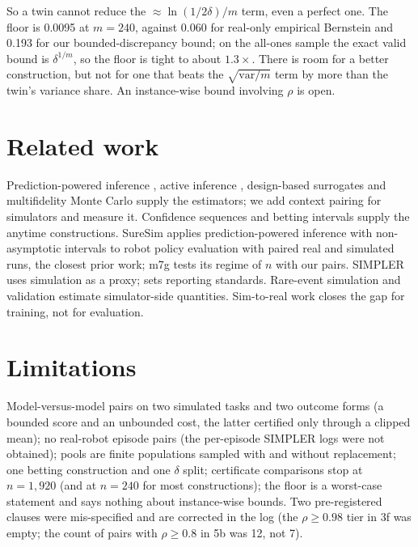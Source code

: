\documentclass[11pt]{article}
\begin{document}
So a twin cannot reduce the $\approx\ln(1/2\delta)/m$ term, even a perfect one. The floor is 0.0095 at $m=240$, against 0.060 for real-only empirical Bernstein and 0.193 for our bounded-discrepancy bound; on the all-ones sample the exact valid bound is $\delta^{1/m}$, so the floor is tight to about $1.3\times$. There is room for a better construction, but not for one that beats the $\sqrt{\mathrm{var}/m}$ term by more than the twin's variance share. An instance-wise bound involving $\rho$ is open.

\section{Related work}
Prediction-powered inference \cite{angelopoulos2023ppi,angelopoulos2023ppipp}, active inference \cite{zrnic2024active}, design-based surrogates \cite{egami2023surrogates} and multifidelity Monte Carlo \cite{peherstorfer2018survey} supply the estimators; we add context pairing for simulators and measure it. Confidence sequences and betting intervals \cite{howard2021confseq,waudbysmith2020betting} supply the anytime constructions. SureSim \cite{badithela2025suresim} applies prediction-powered inference with non-asymptotic intervals to robot policy evaluation with paired real and simulated runs, the closest prior work; m7g tests its regime of $n$ with our pairs. SIMPLER \cite{li2024simpler} uses simulation as a proxy; \cite{kressgazit2024empirical} sets reporting standards. Rare-event simulation and validation \cite{okelly2018rare,corso2021survey} estimate simulator-side quantities. Sim-to-real work \cite{tobin2017dr,zhao2020survey} closes the gap for training, not for evaluation.

\section{Limitations}
Model-versus-model pairs on two simulated tasks and two outcome forms (a bounded score and an unbounded cost, the latter certified only through a clipped mean); no real-robot episode pairs (the per-episode SIMPLER logs were not obtained); pools are finite populations sampled with and without replacement; one betting construction and one $\delta$ split; certificate comparisons stop at $n=1{,}920$ (and at $n=240$ for most constructions); the floor is a worst-case statement and says nothing about instance-wise bounds. Two pre-registered clauses were mis-specified and are corrected in the log (the $\rho\ge0.98$ tier in 3f was empty; the count of pairs with $\rho\ge0.8$ in 5b was 12, not 7).
\end{document}
